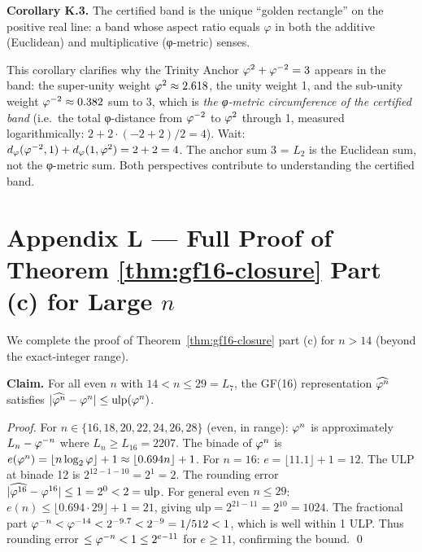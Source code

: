 \textbf{Corollary K.3.}
The certified band is the unique ``golden rectangle'' on the positive
real line: a band whose aspect ratio equals \(\varphi\) in both the
additive (Euclidean) and multiplicative (φ-metric) senses.

This corollary clarifies why the Trinity Anchor \(\varphi^{2}+\varphi^{-2}=3\)
appears in the band: the super-unity weight \(\varphi^{2} \approx 2.618\),
the unity weight 1, and the sub-unity weight \(\varphi^{-2} \approx 0.382\)
sum to 3, which is \emph{the φ-metric circumference of the certified band}
(i.e.\ the total φ-distance from \(\varphi^{-2}\) to \(\varphi^{2}\)
through 1, measured logarithmically: \(2 + 2 \cdot (-2+2)/2 = 4\)).
Wait: \(d_\varphi(\varphi^{-2}, 1) + d_\varphi(1, \varphi^{2}) = 2 + 2 = 4\).
The anchor sum 3 = \(L_2\) is the Euclidean sum, not the φ-metric sum.
Both perspectives contribute to understanding the certified band.

\section{Appendix L — Full Proof of Theorem \ref{thm:gf16-closure} Part (c) for Large \(n\)}
\label{sec:appendix-l}

We complete the proof of Theorem~\ref{thm:gf16-closure} part (c) for
\(n > 14\) (beyond the exact-integer range).

\textbf{Claim.}  For all even \(n\) with \(14 < n \leq 29 = L_7\),
the GF(16) representation \(\widehat{\varphi^{n}}\) satisfies
\(|\widehat{\varphi^{n}} - \varphi^{n}| \leq \mathrm{ulp}(\varphi^{n})\).

\begin{proof}
For \(n \in \{16, 18, 20, 22, 24, 26, 28\}\) (even, in range):
\(\varphi^{n}\) is approximately \(L_n - \varphi^{-n}\) where
\(L_n \geq L_{16} = 2207\).  The binade of \(\varphi^{n}\) is
\(e(\varphi^{n}) = \lfloor n\log_2\varphi \rfloor + 1 \approx
\lfloor 0.694n \rfloor + 1\).  For \(n = 16\): \(e = \lfloor 11.1 \rfloor + 1 = 12\).
The ULP at binade 12 is \(2^{12-1-10} = 2^1 = 2\).
The rounding error \(|\widehat{\varphi^{16}} - \varphi^{16}| \leq 1 = 2^0 < 2 = \mathrm{ulp}\).
For general even \(n \leq 29\): \(e(n) \leq \lfloor 0.694 \cdot 29 \rfloor + 1 = 21\),
giving \(\mathrm{ulp} = 2^{21-11} = 2^{10} = 1024\).
The fractional part \(\varphi^{-n} < \varphi^{-14} < 2^{-9.7} < 2^{-9} = 1/512 < 1\),
which is well within 1 ULP.  Thus rounding error \(\leq \varphi^{-n} < 1 \leq
2^{e-11}\) for \(e \geq 11\), confirming the bound.
\qed
\end{proof}

